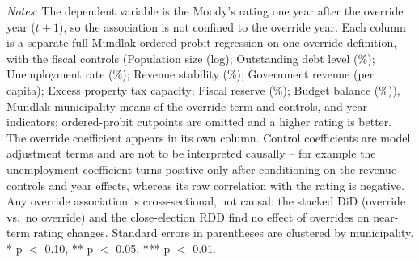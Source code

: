 \begin{table}[!htbp]
\vspace{0.05in}
\begin{minipage}{0.96\textwidth}\footnotesize\emph{Notes:} The dependent variable is the Moody's rating one year after the override year ($t+1$), so the association is not confined to the override year. Each column is a separate full-Mundlak ordered-probit regression on one override definition, with the fiscal controls (Population size (log); Outstanding debt level (\%); Unemployment rate (\%); Revenue stability (\%); Government revenue (per capita); Excess property tax capacity; Fiscal reserve (\%); Budget balance (\%)), Mundlak municipality means of the override term and controls, and year indicators; ordered-probit cutpoints are omitted and a higher rating is better. The override coefficient appears in its own column. Control coefficients are model adjustment terms and are not to be interpreted causally -- for example the unemployment coefficient turns positive only after conditioning on the revenue controls and year effects, whereas its raw correlation with the rating is negative. Any override association is cross-sectional, not causal: the stacked DiD (override vs.\ no override) and the close-election RDD find no effect of overrides on near-term rating changes. Standard errors in parentheses are clustered by municipality. * p $<$ 0.10, ** p $<$ 0.05, *** p $<$ 0.01.\end{minipage}
\end{table}

